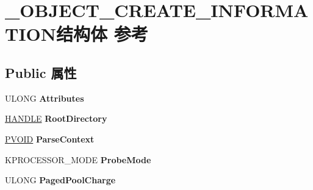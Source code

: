 \hypertarget{struct___o_b_j_e_c_t___c_r_e_a_t_e___i_n_f_o_r_m_a_t_i_o_n}{}\section{\+\_\+\+O\+B\+J\+E\+C\+T\+\_\+\+C\+R\+E\+A\+T\+E\+\_\+\+I\+N\+F\+O\+R\+M\+A\+T\+I\+O\+N结构体 参考}
\label{struct___o_b_j_e_c_t___c_r_e_a_t_e___i_n_f_o_r_m_a_t_i_o_n}
\subsection*{Public 属性}
\begin{DoxyCompactItemize}
\item 
\mbox{\label{struct___o_b_j_e_c_t___c_r_e_a_t_e___i_n_f_o_r_m_a_t_i_o_n_a6f12d60a8d356bb946a7609965599a01}} 
U\+L\+O\+NG {\bfseries Attributes}
\item 
\mbox{\label{struct___o_b_j_e_c_t___c_r_e_a_t_e___i_n_f_o_r_m_a_t_i_o_n_ab71d6d946107a086583a3c8f03c139bd}} 
\hyperlink{interfacevoid}{H\+A\+N\+D\+LE} {\bfseries Root\+Directory}
\item 
\mbox{\label{struct___o_b_j_e_c_t___c_r_e_a_t_e___i_n_f_o_r_m_a_t_i_o_n_a48d0832e82b4872c69ba2d61a78868e0}} 
\hyperlink{interfacevoid}{P\+V\+O\+ID} {\bfseries Parse\+Context}
\item 
\mbox{\label{struct___o_b_j_e_c_t___c_r_e_a_t_e___i_n_f_o_r_m_a_t_i_o_n_a4c05aa7524042ca4ba93283a4e9113e4}} 
K\+P\+R\+O\+C\+E\+S\+S\+O\+R\+\_\+\+M\+O\+DE {\bfseries Probe\+Mode}
\item 
\mbox{\label{struct___o_b_j_e_c_t___c_r_e_a_t_e___i_n_f_o_r_m_a_t_i_o_n_a5b5cc3a786dd23f31b7b5585816f0012}} 
U\+L\+O\+NG {\bfseries Paged\+Pool\+Charge}
\item 
\mbox{\label{struct___o_b_j_e_c_t___c_r_e_a_t_e___i_n_f_o_r_m_a_t_i_o_n_a819638124ef9fd51cdc25b6b443a3fe9}} 

\end{DoxyCompactItemize}
